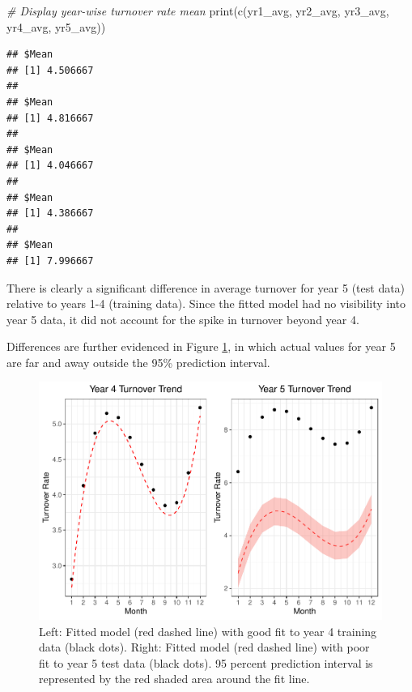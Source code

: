 \documentclass[
]{book}
\newenvironment{Shaded}{\begin{snugshade}}{\end{snugshade}}
\newcommand{\CommentTok}[1]{\textcolor[rgb]{0.56,0.35,0.01}{\textit{#1}}}
\newcommand{\FunctionTok}[1]{\textcolor[rgb]{0.00,0.00,0.00}{#1}}
\newcommand{\NormalTok}[1]{#1}
\begin{document}
\begin{Shaded}
\begin{Highlighting}[]
\CommentTok{\# Display year{-}wise turnover rate mean}
\FunctionTok{print}\NormalTok{(}\FunctionTok{c}\NormalTok{(yr1\_avg, yr2\_avg, yr3\_avg, yr4\_avg, yr5\_avg))}
\end{Highlighting}
\end{Shaded}

\begin{verbatim}
## $Mean
## [1] 4.506667
## 
## $Mean
## [1] 4.816667
## 
## $Mean
## [1] 4.046667
## 
## $Mean
## [1] 4.386667
## 
## $Mean
## [1] 7.996667
\end{verbatim}

There is clearly a significant difference in average turnover for year 5 (test data) relative to years 1-4 (training data). Since the fitted model had no visibility into year 5 data, it did not account for the spike in turnover beyond year 4.

Differences are further evidenced in Figure \ref{fig:mdl-yr4-5}, in which actual values for year 5 are far and away outside the 95\% prediction interval.

\begin{figure}

{\centering \includegraphics[width=1\linewidth]{The_Fundamentals_of_People_Analytics_files/figure-latex/mdl-yr4-5-1} 

}

\caption{Left: Fitted model (red dashed line) with good fit to year 4 training data (black dots). Right: Fitted model (red dashed line) with poor fit to year 5 test data (black dots). 95 percent prediction interval is represented by the red shaded area around the fit line.}\label{fig:mdl-yr4-5}
\end{figure}
\end{document}

